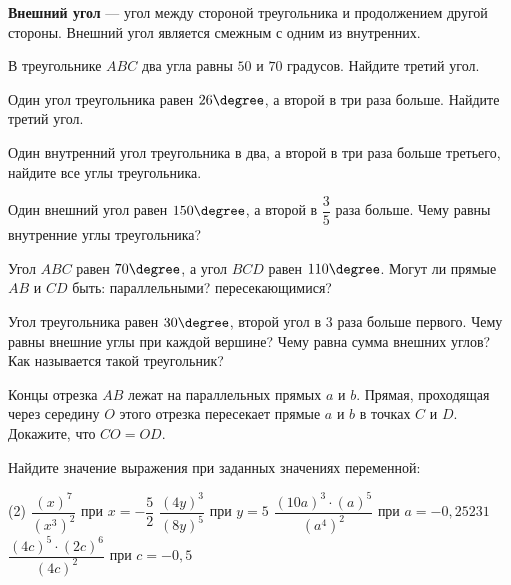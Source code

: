 \begin{class}[number=5]
	\begin{definit}
	\textbf{Внешний угол} --- угол между стороной треугольника и продолжением другой стороны. Внешний угол является смежным с одним из внутренних.
	\end{definit}
	\begin{listofex} %
		\item В треугольнике \( ABC \) два угла равны \( 50\) и \( 70 \) градусов. Найдите третий угол.
		\item Один угол треугольника равен \( 26\degree \), а второй в три раза больше. Найдите третий угол.
		\item Один внутренний угол треугольника в два, а второй в три раза больше третьего, найдите все углы треугольника.
		\item Один внешний угол равен \( 150\degree \), а второй в \( \dfrac{ 3 }{ 5 } \) раза больше. Чему равны внутренние углы треугольника?
		\item Угол \(ABC\) равен \(70 \degree\), а угол \(BCD\) равен \(110 \degree\). Могут ли прямые \(AB\) и \(CD\) быть: параллельными? пересекающимися? %
		\item Угол треугольника равен \( 30\degree \), второй угол в \( 3 \) раза больше первого. Чему равны внешние углы при каждой вершине? Чему равна сумма внешних углов? Как называется такой треугольник?
		\item Концы отрезка \(AB \) лежат на параллельных прямых \(a\) и \(b\). Прямая, проходящая через середину \(O\) этого отрезка пересекает прямые \(a\) и \(b\) в точках \(C\) и \(D\). Докажите, что \(CO=OD\). %
		\item Найдите значение выражения при заданных значениях переменной:
		\begin{tasks}(2)
			\task \( \dfrac{(x)^7}{(x^3)^2} \) при \( x=-\dfrac{5}{2} \)
			\task \( \dfrac{(4y)^3}{(8y)^5} \) при \( y=5 \)
			\task \( \dfrac{(10a)^3 \cdot (a)^5}{(a^4)^2} \) при \( a=-0,25231 \)
			\task \( \dfrac{(4c)^5 \cdot (2c)^6}{(4c)^2} \) при \( c=-0,5 \)
		\end{tasks}
		
	\end{listofex}
\end{class}

